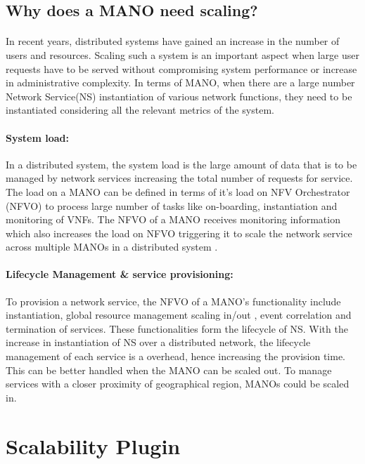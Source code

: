 \subsection{Why does a MANO need scaling?}
\paragraph{}
In recent years, distributed systems have gained an increase in the number of users and resources. Scaling such a system is an important aspect when large user requests have to be served without compromising system performance or increase in administrative complexity. In terms of MANO, when there are a large number Network Service(NS) instantiation of various network functions, they need to be instantiated considering all the relevant metrics of the system.

\paragraph{System load:}
In a distributed system, the system load is the large amount of data that is to be managed by network services increasing the total number of requests for service.
The load on a MANO can be defined in terms of it's load on NFV Orchestrator (NFVO) to process large number of tasks like on-boarding, instantiation and monitoring of VNFs. The NFVO of a MANO receives monitoring information which also increases the load on NFVO triggering it to scale the network service across multiple MANOs in a distributed system \cite{soenen2017optimising}.


\paragraph{Lifecycle Management \& service provisioning:} To provision a network service, the NFVO of a MANO's functionality include instantiation, global resource management scaling in/out , event correlation and termination of services. These functionalities form the lifecycle of NS. With the increase in instantiation of NS over a distributed network, the lifecycle management of each service is a overhead, hence increasing the provision time. This can be better handled when the MANO can be scaled out. To manage services with a closer proximity of geographical region, MANOs could be scaled in.



\section{Scalability Plugin}

